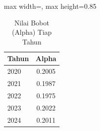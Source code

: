 \begin{table}[H]
\centering
\caption{Nilai Bobot (Alpha) Tiap Tahun} \label{tab:alpha}
\begin{adjustbox}{max width=\textwidth, max height=0.85\textheight}
\begin{tabular}{|m{}|c|}
\hline
\textbf{Tahun} & \textbf{Alpha} \\
\hline
2020 & 0.2005 \\
2021 & 0.1987 \\
2022 & 0.1975 \\
2023 & 0.2022 \\
2024 & 0.2011 \\
\hline
\end{tabular}
\end{adjustbox}
\end{table}